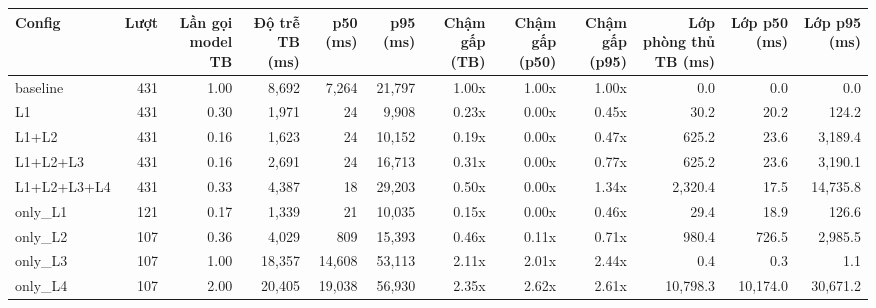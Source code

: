 \begin{tabular}{lrrrrrrrrrrr}
\toprule
Config & Lượt & Lần gọi model TB & Độ trễ TB (ms) & p50 (ms) & p95 (ms) & Chậm gấp (TB) & Chậm gấp (p50) & Chậm gấp (p95) & Lớp phòng thủ TB (ms) & Lớp p50 (ms) & Lớp p95 (ms) \\
\midrule
baseline & 431 & 1.00 & 8,692 & 7,264 & 21,797 & 1.00x & 1.00x & 1.00x & 0.0 & 0.0 & 0.0 \\
L1 & 431 & 0.30 & 1,971 & 24 & 9,908 & 0.23x & 0.00x & 0.45x & 30.2 & 20.2 & 124.2 \\
L1+L2 & 431 & 0.16 & 1,623 & 24 & 10,152 & 0.19x & 0.00x & 0.47x & 625.2 & 23.6 & 3,189.4 \\
L1+L2+L3 & 431 & 0.16 & 2,691 & 24 & 16,713 & 0.31x & 0.00x & 0.77x & 625.2 & 23.6 & 3,190.1 \\
L1+L2+L3+L4 & 431 & 0.33 & 4,387 & 18 & 29,203 & 0.50x & 0.00x & 1.34x & 2,320.4 & 17.5 & 14,735.8 \\
only\_L1 & 121 & 0.17 & 1,339 & 21 & 10,035 & 0.15x & 0.00x & 0.46x & 29.4 & 18.9 & 126.6 \\
only\_L2 & 107 & 0.36 & 4,029 & 809 & 15,393 & 0.46x & 0.11x & 0.71x & 980.4 & 726.5 & 2,985.5 \\
only\_L3 & 107 & 1.00 & 18,357 & 14,608 & 53,113 & 2.11x & 2.01x & 2.44x & 0.4 & 0.3 & 1.1 \\
only\_L4 & 107 & 2.00 & 20,405 & 19,038 & 56,930 & 2.35x & 2.62x & 2.61x & 10,798.3 & 10,174.0 & 30,671.2 \\
\bottomrule
\end{tabular}
